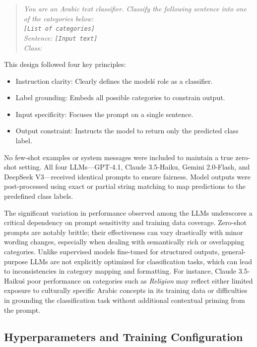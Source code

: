 \documentclass[sn-mathphys-num]{sn-jnl}
\begin{document}
\begin{quote}
\textit{You are an Arabic text classifier. Classify the following sentence into one of the categories below:\\
\texttt{[List of categories]}\\
Sentence: \texttt{[Input text]}\\
Class:}
\end{quote}

This design followed four key principles:
\begin{itemize}
    \item Instruction clarity: Clearly defines the model\'s role as a classifier.
    \item Label grounding: Embeds all possible categories to constrain output.
    \item Input specificity: Focuses the prompt on a single sentence.
    \item Output constraint: Instructs the model to return only the predicted class label.
\end{itemize}

No few-shot examples or system messages were included to maintain a true zero-shot setting. All four LLMs—GPT-4.1, Claude 3.5-Haiku, Gemini 2.0-Flash, and DeepSeek V3—received identical prompts to ensure fairness. Model outputs were post-processed using exact or partial string matching to map predictions to the predefined class labels.

The significant variation in performance observed among the LLMs underscores a critical dependency on prompt sensitivity and training data coverage. Zero-shot prompts are notably brittle; their effectiveness can vary drastically with minor wording changes, especially when dealing with semantically rich or overlapping categories. Unlike supervised models fine-tuned for structured outputs, general-purpose LLMs are not explicitly optimized for classification tasks, which can lead to inconsistencies in category mapping and formatting. For instance, Claude 3.5-Haiku\'s poor performance on categories such as \textit{Religion} may reflect either limited exposure to culturally specific Arabic concepts in its training data or difficulties in grounding the classification task without additional contextual priming from the prompt.

\subsection{Hyperparameters and Training Configuration}
\end{document}
